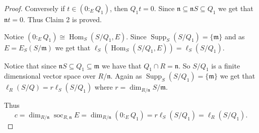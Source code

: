\documentclass{amsart}
\theoremstyle{plain}
\theoremstyle{definition}
\theoremstyle{remark}
\numberwithin{equation}{theorem}
\begin{document}
\begin{proof}
Conversely if $t \in (0 \colon_E Q_1)$, then $Q_1t = 0$. Since ${\mathfrak{n} } \subseteq {\mathfrak{n} } S \subseteq Q_1$ we get that ${\mathfrak{n} } t = 0$. Thus Claim 2 is proved.

Notice $(0 \colon_E Q_1) \cong {\operatorname{Hom}}_S(S/Q_1, E)$. Since ${\operatorname{Supp}}_S(S/Q_1) = \{ {\mathfrak{m} } \}$ and as $E = E_S(S/{\mathfrak{m} })$ we get that
$\ell_S({\operatorname{Hom}}_S(S/Q_1, E)) = \ell_S(S/Q_1)$.

Notice that since ${\mathfrak{n} } S \subseteq Q_1 \subseteq {\mathfrak{m} }$ we have that $Q_1 \cap R = {\mathfrak{n} }$. So $S/Q_1$ is a finite dimensional vector space over $R/{\mathfrak{n} }$.
Again as ${\operatorname{Supp}}_S(S/Q_1) = \{ {\mathfrak{m} } \}$ we get that $\ell_R (S/Q) = r \ell_S (S/Q_1)$ where $r = \dim_{R/{\mathfrak{n} }} S/{\mathfrak{m} }$.

Thus
\[
c = \dim_{R/{\mathfrak{n} }}{\operatorname{soc}}_{R,{\mathfrak{n} }} E = \dim_{R/{\mathfrak{n} }} (0 \colon_E Q_1) = r \ell_S (S/Q_1) = \ell_R(S/Q_1).
\]
\end{proof}
\end{document}
